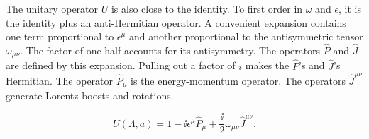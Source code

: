 The unitary operator $U$ is also close to the identity. To first order in
$\omega$ and $\epsilon$, it is the identity plus an anti-Hermitian operator. A
convenient expansion contains one term proportional to $\epsilon^\mu$ and
another
proportional to the antisymmetric tensor $\omega_{\mu\nu}$. The factor of one
half accounts for its antisymmetry. The operators $\hat P$ and $\hat J$ are
defined by this
expansion. Pulling out a factor of $i$ makes the $\hat P$'s and $\hat J$'s
Hermitian.
The operator $\hat P_\mu$ is the energy-momentum operator.
The operators $\hat J^{\mu\nu}$ generate Lorentz boosts and rotations.

\begin{equation}
  U(\Lambda,a)
  =1-\ii\epsilon^\mu\hat P_\mu
   +\frac{\ii}{2}\omega_{\mu\nu}\hat J^{\mu\nu}.
  \label{eq:253a-poincare-generators}
\end{equation}

